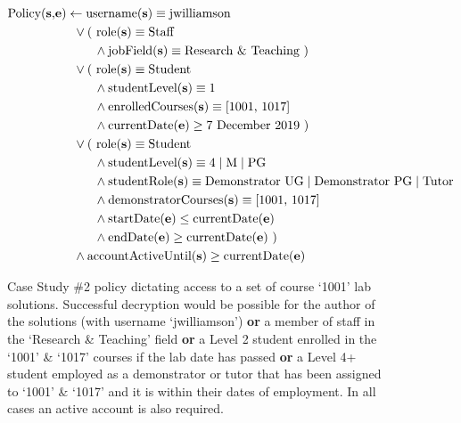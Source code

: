 \begin{figure}[ht]
  \centering
\begin{align*}
  \text{Policy(\textbf{s},\textbf{e})}
  &
    \leftarrow
    \text{username(\textbf{s})} \equiv \text{jwilliamson}
  \\
  &
    \phantom{::}\vee
    \text{( role(\textbf{s})} \equiv \text{Staff}
  \\
  &
    \phantom{::::::::}\wedge
    \text{jobField(\textbf{s})} \equiv \text{Research \& Teaching )}
  \\
  &
    \phantom{::}\vee
    \text{( role(\textbf{s})} \equiv \text{Student}
  \\
  &
    \phantom{::::::::}\wedge
    \text{studentLevel(\textbf{s})} \equiv \text{1}
  \\
  &
    \phantom{::::::::}\wedge
    \text{enrolledCourses(\textbf{s})} \equiv \text{[1001, 1017]}
  \\
  &
    \phantom{::::::::}\wedge
    \text{currentDate(\textbf{e})} \geq \text{7 December 2019 )}
  \\
  &
    \phantom{::}\vee
    \text{( role(\textbf{s})} \equiv \text{Student}
  \\
  &
    \phantom{::::::::}\wedge
    \text{studentLevel(\textbf{s})} \equiv \text{4} \mid \text{M} \mid \text{PG}
  \\
  &
    \phantom{::::::::}\wedge
    \text{studentRole(\textbf{s})} \equiv \text{Demonstrator UG} \mid \text{Demonstrator PG} \mid \text{Tutor}
  \\
  &
    \phantom{::::::::}\wedge
    \text{demonstratorCourses(\textbf{s})} \equiv \text{[1001, 1017]}
  \\
  &
    \phantom{::::::::}\wedge
    \text{startDate(\textbf{e})} \leq \text{currentDate(\textbf{e})}
  \\
  &
    \phantom{::::::::}\wedge
    \text{endDate(\textbf{e})} \geq \text{currentDate(\textbf{e}) )}
  \\
  &
    \phantom{::}\wedge
    \text{accountActiveUntil(\textbf{s})} \geq \text{currentDate(\textbf{e})}
\end{align*}
  \caption{
    \label{fig:case_study_policy_2}
    Case Study \#2 policy dictating access to a set of course `1001' lab solutions.
    Successful decryption would be possible for the author of the solutions (with username `jwilliamson') \textbf{or} a member of staff in the `Research \& Teaching' field \textbf{or} a Level 2 student enrolled in the `1001' \& `1017' courses if the lab date has passed \textbf{or} a Level 4+ student employed as a demonstrator or tutor that has been assigned to `1001' \& `1017' and it is within their dates of employment. In all cases an active account is also required.
  }
\end{figure}

